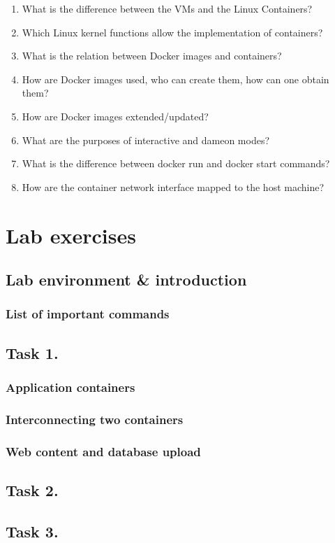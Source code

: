 \documentclass[a4paper]{article}
\begin{document}
\begin{enumerate}
    \item What is the difference between the VMs and the Linux Containers?
    \item Which Linux kernel functions allow the implementation of containers?
    \item What is the relation between Docker images and containers?
    \item How are Docker images used, who can create them, how can one obtain them?
    \item How are Docker images extended/updated?
    \item What are the purposes of interactive and dameon modes?
    \item What is the difference between docker run and docker start commands?
    \item How are the container network interface mapped to the host machine?
\end{enumerate}

\section{Lab exercises}

\subsection{Lab environment \& introduction}
\subsubsection{List of important commands}

\subsection{Task 1.}
\subsubsection{Application containers}
\subsubsection{Interconnecting two containers}
\subsubsection{Web content and database upload}
\subsection{Task 2.}
\subsection{Task 3.}
\end{document}
